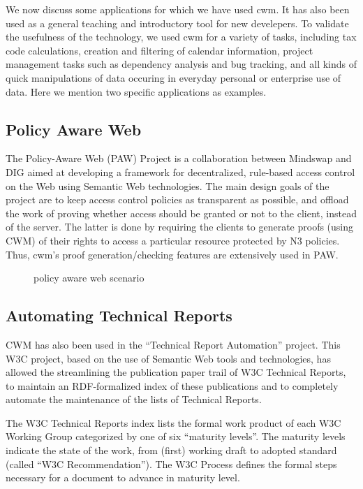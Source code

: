 \documentclass{tlp}
\begin{document}
\par We now discuss some applications for which we have used cwm. It
has also been used as a general teaching and introductory tool for
new develepers\cite{swtut2003}. To validate the
usefulness of the technology, we used cwm for a variety of tasks,
including tax code calculations, creation and filtering of calendar
information, project management tasks such as dependency analysis
and bug tracking, and all kinds of quick manipulations of data
occuring in everyday personal or enterprise use of data. Here we
mention two specific applications as examples.
\subsection{Policy Aware Web}
  

\par The Policy-Aware Web (PAW) Project is a collaboration between
Mindswap and DIG aimed at developing a
framework for decentralized, rule-based access control on the Web
using Semantic Web technologies. The main design goals of the
project are to keep access control policies as transparent as
possible, and offload the work of proving whether access should be
granted or not to the client, instead of the server. The latter is
done by requiring the clients to generate proofs (using CWM) of
their rights to access a particular resource protected by N3
policies. Thus, cwm's proof generation/checking features are
extensively used in PAW.
\begin{figure}[tb]
\centerline{}

\caption{policy aware web scenario}\label{pawfig}

\end{figure}

\subsection{Automating Technical Reports}
  

\par CWM has also been used in the ``Technical Report Automation'' project.
This W3C project, based on the use of Semantic Web tools and
technologies, has allowed the streamlining the publication paper
trail of W3C Technical Reports, to maintain an RDF-formalized index
of these publications and to completely automate the maintenance of
the lists of Technical Reports.

\par The \empty W3C Technical Reports
index lists the formal work product of each W3C Working Group
categorized by one of six ``maturity levels''. The maturity
levels indicate the state of the work, from (first) working draft
to adopted standard (called ``W3C Recommendation''). The
\empty W3C Process
defines the formal steps necessary for a document to advance in
maturity level.
\end{document}

